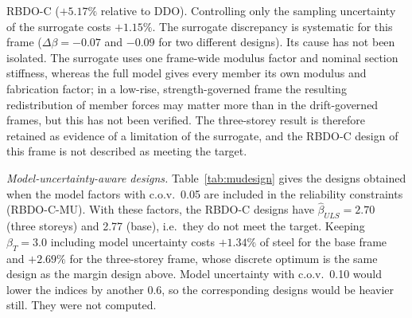 RBDO-C ($+5.17\%$ relative to DDO). Controlling only the sampling uncertainty of the surrogate costs
$+1.15\%$. The surrogate
discrepancy is systematic for this frame ($\Delta\beta=-0.07$ and $-0.09$ for two different
designs). Its cause has not been isolated. The surrogate uses one frame-wide modulus factor and nominal
section stiffness, whereas the full model gives every member its own modulus and fabrication factor;
in a low-rise, strength-governed frame the resulting redistribution of member forces may matter more
than in the drift-governed frames, but this has not been verified. The three-storey result is therefore retained
as evidence of a limitation of the surrogate, and the RBDO-C design of this frame is not described as
meeting the target.

\emph{Model-uncertainty-aware designs.} Table~\ref{tab:mudesign} gives the designs obtained when the
model factors with c.o.v.\ 0.05 are included in the reliability constraints (RBDO-C-MU). With these
factors, the RBDO-C designs have $\hat\beta_{ULS}=2.70$ (three storeys) and 2.77 (base), i.e.\ they
do not meet the target. Keeping $\beta_T=3.0$ including model uncertainty costs $+1.34\%$ of steel
for the base frame and $+2.69\%$ for the three-storey frame, whose discrete optimum is the same
design as the margin design above. Model uncertainty with c.o.v.\ 0.10 would lower the indices by
another 0.6, so the corresponding designs would be heavier still. They were not computed.

\begin{table}[!htbp]
\centering
\caption{Point-estimate (RBDO-C) and confidence-bounded (RBDO-C95) designs ($10^6$ independent
samples). $\beta^{lcb}$: one-sided $95\%$ lower confidence bound. Claim: L = lower bound $\ge$ target
($95\%$ confidence); P, I = point estimate $\ge$ target, interval contains it; I = point estimate
$<$ target, interval contains it; below = interval below the target. Last columns: drift index if
all surrogate drifts are increased by 1\%; a claim other than L there (base and high-wind RBDO-C: below;
nine storeys, both formulations: P, I) marks a result that is sensitive to the $B_1$--$B_2$ drift
approximation. The lower bounds address Monte Carlo sampling uncertainty only.}
\label{tab:strict}
\scriptsize
\fittable{}
\end{table}

\begin{table}[!htbp]
\centering
\caption{Model-uncertainty-aware designs (RBDO-C-MU), optimised for two frames only (three storeys and
base): the reliability constraints include the model factors $\theta_R,\theta_E,\theta_\delta$ with c.o.v.\
0.05 ($10^6$ independent samples). Designs for c.o.v.\ 0.10 were not optimised. Last column: indices of
the same designs without model factors.}
\label{tab:mudesign}
\scriptsize
\fittable{}
\end{table}


